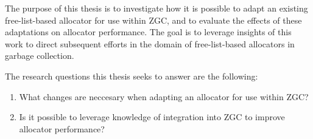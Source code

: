 The purpose of this thesis is to investigate how it is possible to adapt an existing free-list-based allocator for use within ZGC, and to evaluate the effects of these adaptations on allocator performance. The goal is to leverage insights of this work to direct subsequent efforts in the domain of free-list-based allocators in garbage collection.


The research questions this thesis seeks to answer are the following:
\begin{enumerate}
  \item What changes are neccesary when adapting an allocator for use within ZGC?
  \item Is it possible to leverage knowledge of integration into ZGC to improve allocator performance?
\end{enumerate}

